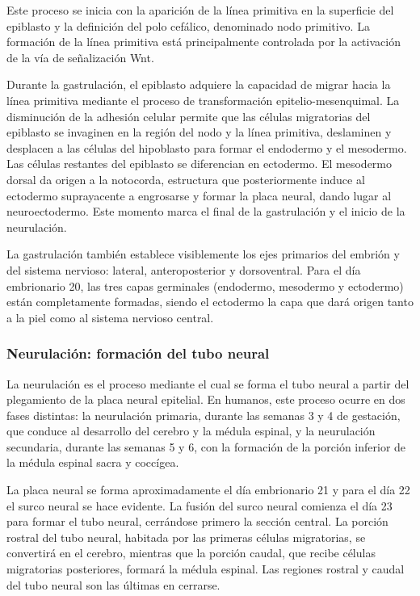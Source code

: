\documentclass[11pt,letterpaper]{report}
\begin{document}
Este proceso se inicia con la aparición de la línea primitiva en la superficie
del epiblasto y la definición del polo cefálico, denominado nodo primitivo. La
formación de la línea primitiva está principalmente controlada por la
activación de la vía de señalización Wnt. \cite{MooreEmbryo4}

Durante la gastrulación, el epiblasto adquiere la capacidad de migrar hacia la
línea primitiva mediante el proceso de transformación epitelio-mesenquimal. La
disminución de la adhesión celular permite que las células migratorias del
epiblasto se invaginen en la región del nodo y la línea primitiva, deslaminen
y desplacen a las células del hipoblasto para formar el endodermo y el
mesodermo. Las células restantes del epiblasto se diferencian en ectodermo. El
mesodermo dorsal da origen a la notocorda, estructura que posteriormente induce
al ectodermo suprayacente a engrosarse y formar la placa neural, dando lugar al
neuroectodermo. Este momento marca el final de la gastrulación y el inicio de
la neurulación. \cite{Polin124}

La gastrulación también establece visiblemente los ejes primarios del embrión y
del sistema nervioso: lateral, anteroposterior y dorsoventral. Para el día
embrionario 20, las tres capas germinales (endodermo, mesodermo y ectodermo)
están completamente formadas, siendo el ectodermo la capa que dará origen tanto
a la piel como al sistema nervioso central. \cite{Polin124}

\subsubsection{Neurulación: formación del tubo neural}
La neurulación es el proceso mediante el cual se forma el tubo neural a partir
del plegamiento de la placa neural epitelial. En humanos, este proceso ocurre
en dos fases distintas: la neurulación primaria, durante las semanas 3 y 4 de
gestación, que conduce al desarrollo del cerebro y la médula espinal, y la
neurulación secundaria, durante las semanas 5 y 6, con la formación de la
porción inferior de la médula espinal sacra y coccígea. \cite{Polin124}

La placa neural se forma aproximadamente el día embrionario 21 y para el día 22
el surco neural se hace evidente. La fusión del surco neural comienza el día 23
para formar el tubo neural, cerrándose primero la sección central. La porción
rostral del tubo neural, habitada por las primeras células migratorias, se
convertirá en el cerebro, mientras que la porción caudal, que recibe células
migratorias posteriores, formará la médula espinal. Las regiones rostral y
caudal del tubo neural son las últimas en cerrarse. \cite{Gibb2018}
\end{document}
